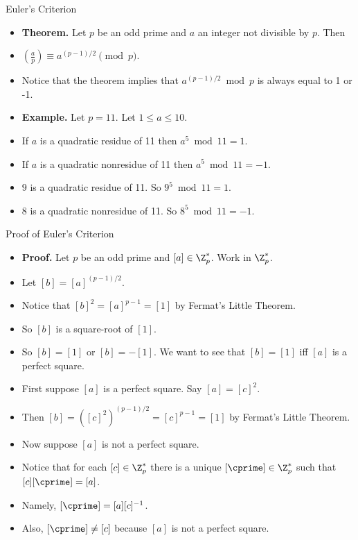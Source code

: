 \documentclass{beamer}
\begin{document}
\begin{frame}{Euler's Criterion}

\begin{itemize}
  \item \textbf{Theorem.} Let $p$ be an odd prime and $a$ an integer not divisible by $p$. Then
  \item $(\frac{a}{p}) \equiv a^{(p-1)/2} \pmod p$.
  \item Notice that the theorem implies that $a^{(p-1)/2} \bmod p$ is always equal to 1 or -1.
  \item \textbf{Example.} Let $p=11$. Let $1\leq a \leq 10$.
  \item If $a$ is a quadratic residue of 11 then $a^5 \bmod 11 = 1$.
  \item If $a$ is a quadratic nonresidue of 11 then $a^5 \bmod 11 = -1$.
  \item $9$ is a quadratic residue of 11. So $9^5 \bmod 11 = 1$.
  \item $8$ is a quadratic nonresidue of 11. So $8^5 \bmod 11 = -1$.
\end{itemize}

\end{frame}


\begin{frame}{Proof of Euler's Criterion}

\begin{itemize}
  \item \textbf{Proof.} Let $p$ be an odd prime and $[a]\in\Z^*_p$. Work in $\Z^*_p$.
  \item Let $[b]=[a]^{(p-1)/2}$.
  \item Notice that $[b]^2 = [a]^{p-1} = [1]$ by Fermat's Little Theorem.
  \item So $[b]$ is a square-root of $[1]$.
  \item So $[b] = [1]$ or $[b] = -[1]$. We want to see that $[b]=[1]$ iff $[a]$ is a perfect square.
  \item First suppose $[a]$ is a perfect square. Say $[a] = [c]^2$.
  \item Then $[b]= ([c]^2)^{(p-1)/2}=[c]^{p-1}=[1]$ by Fermat's Little Theorem.
  \item Now suppose $[a]$ is not a perfect square.
  \item Notice that for each $[c]\in\Z^*_p$ there is a unique $[\cprime]\in\Z^*_p$ such that $[c][\cprime] = [a]$.
  \item Namely, $[\cprime] = [a][c]^{-1}$.
  \item Also, $[\cprime]\not= [c]$ because $[a]$ is not a perfect square.
\end{itemize}

\end{frame}
\end{document}
